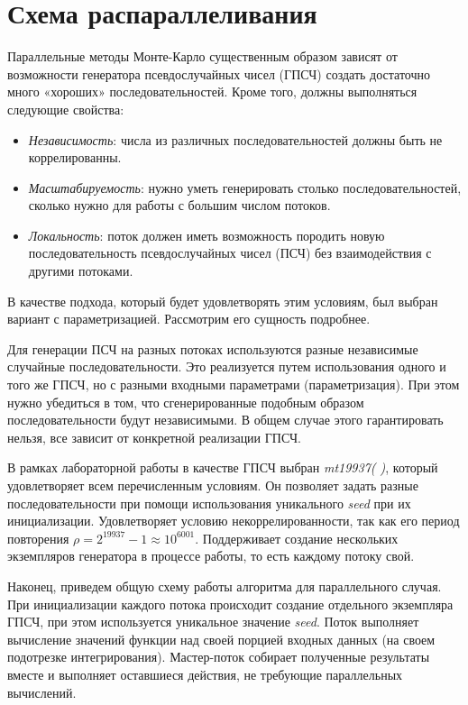 \documentclass{report}
\begin{document}
\section*{Схема распараллеливания}
Параллельные методы Монте-Карло существенным образом зависят от возможности генератора псевдослучайных чисел (ГПСЧ) создать достаточно много «хороших» последовательностей. Кроме того, должны выполняться следующие свойства:
\begin{itemize}
\item \emph{Независимость}: числа из различных последовательностей должны быть не коррелированны.
\item \emph{Масштабируемость}: нужно уметь генерировать столько последовательностей, сколько нужно для работы с большим числом потоков.
\item \emph{Локальность}: поток должен иметь возможность породить новую последовательность псевдослучайных чисел (ПСЧ) без взаимодействия с другими потоками.
\end{itemize}
\par В качестве подхода, который будет удовлетворять этим условиям, был выбран вариант с параметризацией. Рассмотрим его сущность подробнее.
\par Для генерации ПСЧ на разных потоках используются разные независимые случайные последовательности. Это реализуется путем использования одного и того же ГПСЧ, но с разными входными параметрами (параметризация). При этом нужно убедиться в том, что сгенерированные подобным образом последовательности будут независимыми. В общем случае этого гарантировать нельзя, все зависит от конкретной реализации ГПСЧ.
\par В рамках лабораторной работы в качестве ГПСЧ выбран \emph{mt19937( )}, который удовлетворяет всем перечисленным условиям. Он позволяет задать разные последовательности при помощи использования уникального \emph{seed} при их инициализации. Удовлетворяет условию некоррелированности, так как его период повторения $\rho = 2^{19937} - 1 \approx 10^{6001}$. Поддерживает создание нескольких экземпляров генератора в процессе работы, то есть каждому потоку свой.
\par Наконец, приведем общую схему работы алгоритма для параллельного случая. При инициализации каждого потока происходит создание отдельного экземпляра ГПСЧ,  при этом используется уникальное значение \emph{seed}. Поток выполняет вычисление значений функции над своей порцией входных данных (на своем подотрезке интегрирования). Мастер-поток собирает полученные результаты вместе и выполняет оставшиеся действия, не требующие параллельных вычислений.
\newpage
\end{document}
